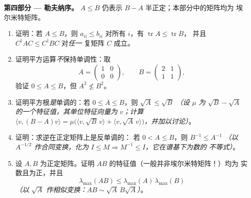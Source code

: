 \begin{problem}
\medskip
\noindent\textbf{第四部分 --- 勒夫纳序。} $A \leq B$
仍表示 $B - A$ 半正定；本部分中的矩阵均为
埃尔米特矩阵。
\begin{enumerate}[resume]
  \item 证明：若 $A \leq B$，则 $a_{ii} \leq b_{ii}$ 对所有
        $i$，有 $\operatorname{tr} A \leq \operatorname{tr} B$，
        并且 $C^\dagger AC \leq C^\dagger BC$ 对\emph{任一}
        复矩阵 $C$ 成立。
  \item 证明平方运算\emph{不}保持单调性：取
        \[
        A = \begin{pmatrix} 1 & 0\\ 0 & 0\end{pmatrix},
        \qquad
        B = \begin{pmatrix} 2 & 1\\ 1 & 1\end{pmatrix},
        \]
        验证 $0 \leq A \leq B$，但 $A^2 \not\leq B^2$。
  \item 证明平方根\emph{是}单调的：若 $0 \leq
        A \leq B$，则 $\sqrt A \leq \sqrt B$ \emph{（设
        $\mu$ 为 $\sqrt B - \sqrt A$ 的一个特征值，其单位特征向量为
        $v$；计算 $\langle v, (B - A)v\rangle =
        \mu\bigl(\langle v, \sqrt B\,v\rangle + \langle v,
        \sqrt A\,v\rangle\bigr)$，并加以讨论）}。
  \item 证明：求逆在正定矩阵上是反单调的：
        若 $0 < A \leq B$，则 $B^{-1} \leq A^{-1}$
        \emph{（以 $A^{-1/2}$ 作合同变换，化为 $I \leq M
        \Rightarrow M^{-1} \leq I$，它在谱基下为数的
        不等式）}。
  \item 设 $A, B$ 为正定矩阵。证明
        $AB$ 的特征值（一般并非埃尔米特矩阵！）均为
        实数且为正，并且
        \[
        \lambda_{\max}(AB) \leq
        \lambda_{\max}(A)\,\lambda_{\max}(B)
        \]
        \emph{（以 $\sqrt A$ 作相似变换：$AB \sim \sqrt
        A\,B\sqrt A$）}。
\end{enumerate}


\end{problem}

